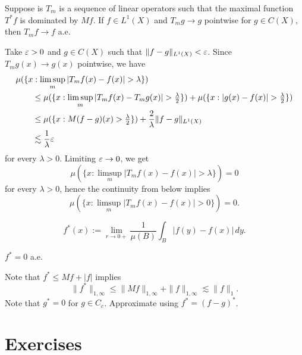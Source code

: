 \documentclass{../../large}
\begin{document}
\begin{prb}
Suppose is $T_m$ is a sequence of linear operators such that the maximal function $T^*f$ is dominated by $Mf$.
If $f\in L^1(X)$ and $T_mg\to g$ pointwise for $g\in C(X)$, then $T_mf\to f$ a.e.
\end{prb}
\begin{pf}
Take $\varepsilon>0$ and $g\in C(X)$ such that $\|f-g\|_{L^1(X)}<\varepsilon$.
Since $T_mg(x)\to g(x)$ pointwise, we have
\begin{align*}
&\mu(\{x:\limsup_m|T_mf(x)-f(x)|>\lambda\})\\
&\qquad\le\mu(\{x:\limsup_m|T_mf(x)-T_mg(x)|>\tfrac\lambda2\})
+\mu(\{x:|g(x)-f(x)|>\tfrac\lambda2\})\\
&\qquad\le\mu(\{x:M(f-g)(x)>\tfrac\lambda2\})+\frac2\lambda\|f-g\|_{L^1(X)}\\
&\qquad\lesssim\frac1\lambda\e
\end{align*}
for every $\lambda>0$.
Limiting $\varepsilon\to0$, we get
\[\mu(\{x:\limsup_m|T_mf(x)-f(x)|>\lambda\})=0\]
for every $\lambda>0$, hence the continuity from below implies
\[\mu(\{x:\limsup_m|T_mf(x)-f(x)|>0\})=0.\]
\end{pf}


\begin{defn}
\[f^*(x):=\lim_{r\to0+}\frac1{\mu(B)}\int_B|f(y)-f(x)|\,dy.\]
\end{defn}
\begin{thm}
$f^*=0$ a.e.
\end{thm}
\begin{pf}
Note that $f^*\le Mf+|f|$ implies
\[\|f^*\|_{1,\infty}\le\|Mf\|_{1,\infty}+\|f\|_{1,\infty}\lesssim\|f\|_1.\]
Note that $g^*=0$ for $g\in C_c$.
Approximate using $f^*=(f-g)^*$.
\end{pf}

\section*{Exercises}
\begin{prb}

\end{prb}
\end{document}
